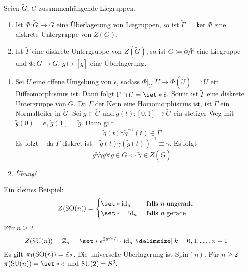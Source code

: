 \begin{korollar}[label=lem:133,{name=[{Kern einer Überlagerung ist diskrete Untergruppe des Zentrums}]}]
    Seien $\widetilde{G}$, $G$ zusammenhängende Liegruppen. 
    \begin{enumerate}[1)]
        \item Ist $\Phi \colon \widetilde{G} \to G$ eine Überlagerung von Liegruppen, so ist $\widetilde{\Gamma} = \ker \Phi$ eine diskrete Untergruppe von $Z(G)$.
        \item Ist $\widetilde{\Gamma}$ eine diskrete Untergruppe von $Z(\widetilde{G})$, so ist $G \coloneqq \sfrac{\widetilde{G}}{\widetilde{\Gamma}}$ eine Liegruppe und $\Phi \colon \widetilde{G} \to G$, $\widetilde{g} \mapsto [\widetilde{g}]$ eine Überlagerung.
    \end{enumerate}
\end{korollar}
\begin{beweis}
    \begin{enumerate}[1)]
        \item Sei $\tilde{U}$ eine offene Umgebung von $\tilde{e}$, sodass $\Phi|_{\tilde{U}} \colon \tilde{U} \to \Phi(\tilde{U}) =: U$ ein Diffeomorphismus ist.
        Dann folgt $\tilde{\Gamma} \cap \tilde{U} = \set*{\tilde{e}}$.
        Somit ist $\tilde{\Gamma}$ eine diskrete Untergruppe von $\tilde{G}$.
        Da $\tilde{\Gamma}$ der Kern eine Homomorphismus ist, ist $\tilde{\Gamma}$ ein Normalteiler in $\tilde{G}$.
        Sei $\tilde{g} \in \tilde{G}$ und $\tilde{g}(t) \colon [0,1] \to \tilde{G}$ ein stetiger Weg mit $\tilde{g}(0)=\tilde{e}$, $\tilde{g}(1)=\tilde{g}$.
        Dann gilt
        \[
            \tilde{g}(t) \tilde{\gamma} \tilde{g}^{-1}(t) \in \tilde{\Gamma}
        \]
        Es folgt -- da $\tilde{\Gamma}$ diskret ist -- $\tilde{g}(t) \tilde{\gamma} (\tilde{g}(t))^{-1} \equiv \tilde{\gamma}$.
        Es folgt 
        \[
            \tilde{g} \tilde{\gamma} \tilde{\gamma} \tilde{g} \forall \tilde{g} \in \tilde{G} \iff \tilde{\gamma} \in Z(\tilde{G})
        \]
        \item \emph{Übung!}
    \end{enumerate}
\end{beweis}

Ein kleines Beispiel:
\[
    Z \enbrace*{\SO(n)} = \begin{cases}
        \set*{\id_n} &\text{ falls } n \text{ ungerade} \\
        \set*{\pm \id_n} &\text{ falls $n$ gerade}
    \end{cases}
\]
Für $n \ge 2$
\[
    Z \enbrace*{\SU(n)} = \mathbb{Z}_n = \set*{e^{2 \pi i \sfrac{k}{n}} \cdot \id_n \given k=0,1,\ldots ,n-1 }
\]
Es gilt $\pi_1(\operatorname{SO}(n))= \mathbb{Z}_2$.
Die universelle Überlagerung ist $\mathrm{Spin}(n)$.
Für $n\ge 2$ $\pi \enbrace*{\SU(n)} = \set*{e}$ und $\operatorname{SU}(2) = S^3$.

